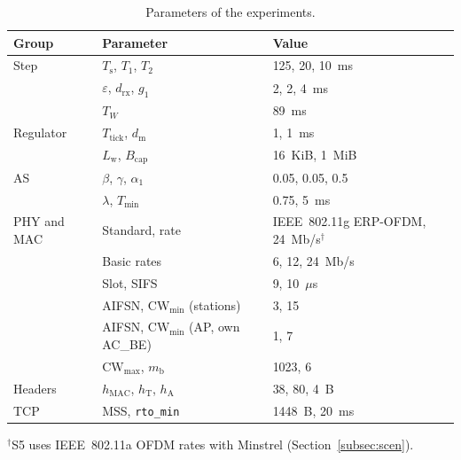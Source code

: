 \begin{table}[t]
\caption{Parameters of the experiments.}\label{tab:param}
\centering\footnotesize
\begin{tabular}{@{}lll@{}}
\toprule
Group & Parameter & Value \\
\midrule
Step & $T_{\mathrm{s}}$, $T_1$, $T_2$ & 125, 20, 10~ms \\
 & $\varepsilon$, $d_{\mathrm{rx}}$, $g_1$ & 2, 2, 4~ms \\
 & $T_W$ & 89~ms \\
Regulator & $T_{\mathrm{tick}}$, $d_{\mathrm{m}}$ & 1, 1~ms \\
 & $L_{\mathrm{w}}$, $B_{\mathrm{cap}}$ & 16~KiB, 1~MiB \\
AS & $\beta$, $\gamma$, $\alpha_1$ & 0.05, 0.05, 0.5 \\
 & $\lambda$, $T_{\min}$ & 0.75, 5~ms \\
PHY and MAC & Standard, rate & IEEE~802.11g ERP-OFDM, 24~Mb/s$^{\dagger}$ \\
 & Basic rates & 6, 12, 24~Mb/s \\
 & Slot, SIFS & 9, 10~$\mu$s \\
 & AIFSN, $\mathrm{CW}_{\min}$ (stations) & 3, 15 \\
 & AIFSN, $\mathrm{CW}_{\min}$ (AP, own AC\_BE) & 1, 7 \\
 & $\mathrm{CW}_{\max}$, $m_{\mathrm{b}}$ & 1023, 6 \\
Headers & $h_{\mathrm{MAC}}$, $h_{\mathrm{T}}$, $h_{\mathrm{A}}$ & 38, 80, 4~B \\
TCP & MSS, \texttt{rto\_min} & 1448~B, 20~ms \\
\bottomrule
\end{tabular}

\smallskip
\raggedright\footnotesize $^{\dagger}$S5 uses IEEE~802.11a OFDM rates with Minstrel (Section~\ref{subsec:scen}).
\end{table}

